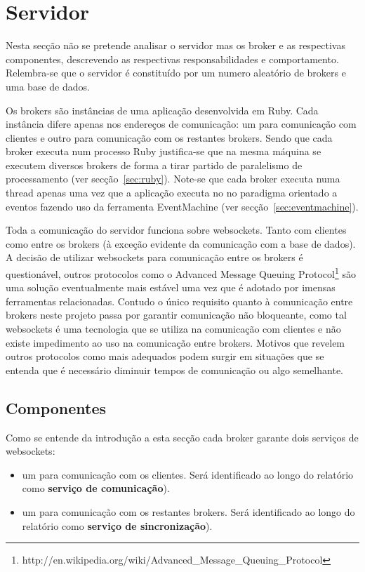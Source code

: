 \section{Servidor}

Nesta secção não se pretende analisar o servidor mas os broker e as respectivas componentes, descrevendo as respectivas responsabilidades e comportamento.
Relembra-se que o servidor é constituído por um numero aleatório de brokers e uma base de dados.

Os brokers são instâncias de uma aplicação desenvolvida em Ruby. Cada instância difere apenas nos endereços de comunicação: um para comunicação com clientes e outro para comunicação com os restantes brokers.
Sendo que cada broker executa num processo Ruby justifica-se que na mesma máquina se executem diversos brokers de forma a tirar partido de paralelismo de processamento (ver secção~\ref{sec:ruby}).
Note-se que cada broker executa numa thread apenas uma vez que a aplicação executa no no paradigma orientado a eventos fazendo uso da ferramenta EventMachine (ver secção~\ref{sec:eventmachine}).

Toda a comunicação do servidor funciona sobre websockets. Tanto com clientes como entre os brokers (à exceção evidente da comunicação com a base de dados). A decisão de utilizar websockets para comunicação entre os brokers é questionável, outros protocolos como o Advanced Message Queuing Protocol\footnote{http://en.wikipedia.org/wiki/Advanced\_Message\_Queuing\_Protocol} são uma solução eventualmente mais estável uma vez que é adotado por imensas ferramentas relacionadas.
Contudo o único requisito quanto à comunicação entre brokers neste projeto passa por garantir comunicação não bloqueante, como tal websockets é uma tecnologia que se utiliza na comunicação com clientes e não existe impedimento ao uso na comunicação entre brokers. Motivos que revelem outros protocolos como mais adequados podem surgir em situações que se entenda que é necessário diminuir tempos de comunicação ou algo semelhante.

\subsection{Componentes}
Como se entende da introdução a esta secção cada broker garante dois serviços de websockets:

\begin{itemize}
\item um para comunicação com os clientes. Será identificado ao longo do relatório como \textbf{serviço de comunicação}).
\item um para comunicação com os restantes brokers. Será identificado ao longo do relatório como \textbf{serviço de sincronização}).
\end{itemize}


